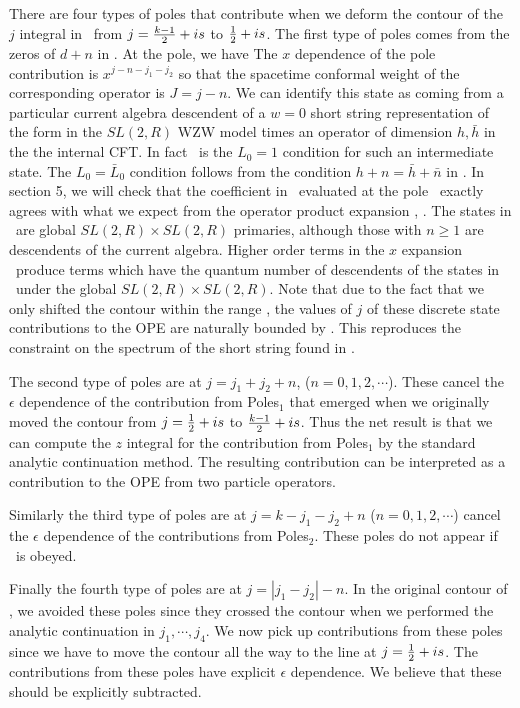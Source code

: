 There are four types of poles that contribute when we deform
the contour of the $j$ integral in \intadd\ from
$j={k-1\over 2} + is$ to ${1\over 2} + is$.
The first type of poles comes from the zeros of
$d + n $ in \expandF. At the pole, we have
\eqn{}
The $x$ dependence of the
pole contribution is $x^{j-n-j_1-j_2}$ so that the spacetime
conformal weight of the corresponding operator is $J=j-n$.
We can identify this state as coming from a particular
current algebra descendent of a $w=0$ short string representation
of the form
\eqn{}
 in the
$SL(2, R)$ WZW
model times an operator of dimension $h,\bar h$ in the
the internal CFT. In fact \shortstring\ is the
$L_0=1$ condition for such an intermediate state. The $L_0=\bar L_0$
condition follows from the condition
 $h+n = \bar h + \bar n$ in  \expandF .
In section 5, we will check that the coefficient in \intadd \expandF\
evaluated at the pole \shortstring\ exactly agrees with
what we expect from the operator product expansion
 \expan , \formofc .
 The states in \discsta\ are global $SL(2,R) \times SL(2,R)$ primaries,
although those with $n \geq 1$ are descendents of the current
algebra. Higher order terms in the $x$ expansion \integral\
 produce terms which have the quantum number of descendents
of the states in \discsta\ under the global
$SL(2,R)\times SL(2,R)$. Note that due to the fact that we only
shifted the contour within the range  ,
the values of $j$ of these discrete state contributions to the
OPE are naturally bounded by \deformregion .
This reproduces the constraint on the spectrum of the
short string found in \refs{\first , \second}.

The second type of poles are at
$j=j_1+j_2+n$, ($n=0,1,2,\cdots$).
These cancel the $\epsilon$ dependence of
the contribution from Poles$_1$ that emerged
when we originally moved the contour from
$j = {1\over 2} + is$ to ${k-1\over 2} + is$.
Thus the net result is that we can compute
the $z$ integral for the contribution from
Poles$_1$ by the standard analytic continuation
method. The resulting contribution can
be interpreted as a contribution to the OPE from
two particle operators.

Similarly the third type of poles are at
$j =k -j_1 -j_2 + n$ ($n=0,1,2,\cdots$) cancel the
$\epsilon$ dependence of the contributions from Poles$_2$.
These poles do not appear if \physcond\ is obeyed.

Finally the fourth type of poles
are at $j= |j_1-j_2| - n$. In the original
contour of \expres, we avoided these poles
since they crossed the contour when we
performed the analytic continuation in $j_1, \cdots, j_4$.
We now pick up contributions from these
poles since we have to move the contour all
the way to the line at $j={1\over 2} + is$.
The contributions from these poles have
explicit $\epsilon$ dependence. We believe that these should
be explicitly subtracted.

